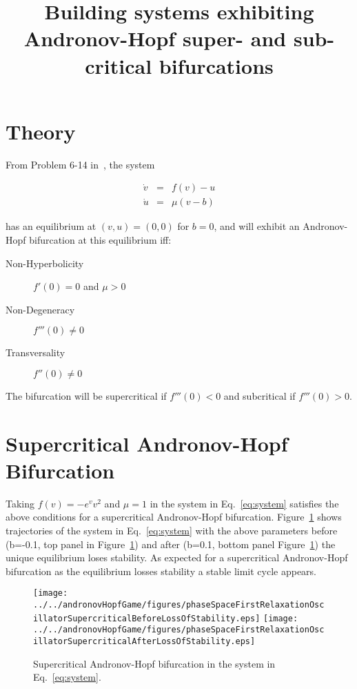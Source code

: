 \documentclass{article}
\begin{document}
\title{Building systems exhibiting Andronov-Hopf super- and sub-critical
bifurcations}

\maketitle

\section{Theory}

From Problem 6-14 in~\citet{izhikevich07}, the system

\begin{eqnarray}
\dot{v}&=&f(v)-u\label{eq:system}\\
\dot{u}&=&\mu(v-b)\nonumber
\end{eqnarray}

\noindent has an equilibrium at $(v,u)=(0,0)$ for $b=0$, and will exhibit an
Andronov-Hopf bifurcation at this equilibrium iff:

\begin{description}
\item[Non-Hyperbolicity] $f'(0)=0$ and $\mu>0$
\item[Non-Degeneracy] $f'''(0)\neq0$
\item[Transversality] $f''(0)\neq0$
\end{description}

\noindent The bifurcation will be supercritical if $f'''(0)<0$ and subcritical
if $f'''(0)>0$.

\section{Supercritical Andronov-Hopf Bifurcation}

Taking $f(v)=-e^vv^2$ and $\mu=1$ in the system in Eq.~\ref{eq:system}
satisfies the above conditions for a supercritical Andronov-Hopf bifurcation.
Figure~\ref{fig:supercriticalAH} shows trajectories of the system  in
Eq.~\ref{eq:system} with the above parameters before (b=-0.1, top panel in
Figure~\ref{fig:supercriticalAH}) and after (b=0.1, bottom panel
Figure~\ref{fig:supercriticalAH}) the unique equilibrium loses stability.  As
expected for a supercritical Andronov-Hopf bifurcation as the equilibrium
losses stability a stable limit cycle appears.

\begin{center}
\begin{figure}
\texttt{[image: ../../andronovHopfGame/figures/phaseSpaceFirstRelaxationOscillatorSupercriticalBeforeLossOfStability.eps]}
\texttt{[image: ../../andronovHopfGame/figures/phaseSpaceFirstRelaxationOscillatorSupercriticalAfterLossOfStability.eps]}
\caption{Supercritical Andronov-Hopf bifurcation in the system in
Eq.~\ref{eq:system}.}
\label{fig:supercriticalAH}
\end{figure}
\end{center}
\end{document}
